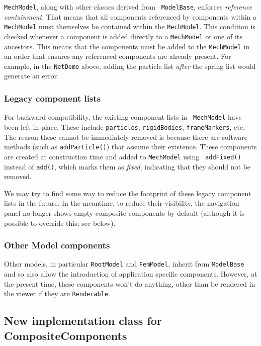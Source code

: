 \documentclass{article}
\begin{document}
{\tt MechModel}, along with other classes derived from {\tt
ModelBase}, enforces {\it reference containment}. That means that all
components referenced by components within a {\tt MechModel} must
themselves be contained within the {\tt MechModel}.  This condition is
checked whenever a component is added directly to a {\tt MechModel} or
one of its ancestors. This means that the components must be added to
the {\tt MechModel} in an order that ensures any referenced components are
already present. For example, in the {\tt NetDemo} above, adding the
particle list {\it after} the spring list would generate an error.

\subsubsection*{Legacy component lists}

For backward compatibility, the existing component lists in {\tt
MechModel} have been left in place. These include {\tt particles},
{\tt rigidBodies}, {\tt frameMarkers}, etc. The reason these cannot be
immediately removed is because there are software methods (such as
{\tt addParticle()}) that assume their existence. These components are
created at construction time and added to {\tt MechModel} using {\tt
addFixed()} instead of {\tt add()}, which marks them as {\it fixed},
indicating that they should not be removed.

We may try to find some way to reduce the footprint of these legacy
component lists in the future. In the meantime, to reduce their
visibility, the navigation panel no longer shows empty composite
components by default (although it is possible to override this; see
below).

\subsubsection*{Other Model components}

Other models, in particular {\tt RootModel} and {\tt FemModel},
inherit from {\tt ModelBase} and so also allow the introduction of
application specific components. However, at the present time, these
components won't do anything, other than be rendered in the viewer if
they are {\tt Renderable}.

\subsection*{New implementation class for CompositeComponents}
\end{document}

